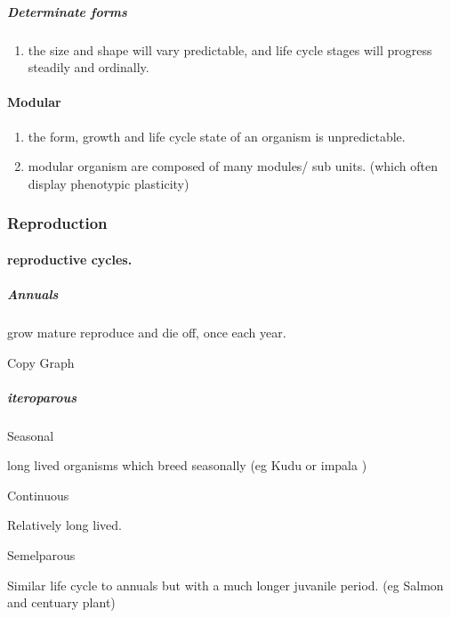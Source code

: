 \documentclass[]{article}
\providecommand{\tightlist}{%
  \setlength{\itemsep}{0pt}\setlength{\parskip}{0pt}}
\let\oldparagraph\paragraph
\renewcommand{\paragraph}[1]{\oldparagraph{#1}\mbox{}}
\let\oldsubparagraph\subparagraph
\renewcommand{\subparagraph}[1]{\oldsubparagraph{#1}\mbox{}}
\begin{document}
\hypertarget{determinate-forms}{%
\subparagraph{Determinate forms}\label{determinate-forms}}

\begin{enumerate}
\def\labelenumi{\arabic{enumi}.}
\tightlist
\item
  the size and shape will vary predictable, and life cycle stages will
  progress steadily and ordinally.
\end{enumerate}

\hypertarget{modular}{%
\paragraph{Modular}\label{modular}}

\begin{enumerate}
\def\labelenumi{\arabic{enumi}.}
\tightlist
\item
  the form, growth and life cycle state of an organism is unpredictable.
\item
  modular organism are composed of many modules/ sub units. (which often
  display phenotypic plasticity)
\end{enumerate}

\hypertarget{reproduction}{%
\subsubsection{Reproduction}\label{reproduction}}

\hypertarget{reproductive-cycles.}{%
\paragraph{reproductive cycles.}\label{reproductive-cycles.}}

\hypertarget{annuals}{%
\subparagraph{Annuals}\label{annuals}}

grow mature reproduce and die off, once each year.

Copy Graph

\hypertarget{iteroparous}{%
\subparagraph{iteroparous}\label{iteroparous}}

Seasonal

long lived organisms which breed seasonally (eg Kudu or impala )

Continuous

Relatively long lived.

Semelparous

Similar life cycle to annuals but with a much longer juvanile period.
(eg Salmon and centuary plant)
\end{document}
